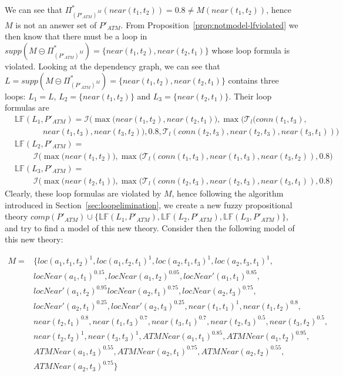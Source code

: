 \documentclass{tlp}
\newcommand{\comp}[1]{\ensuremath{comp(#1)}}
\newcommand{\loopform}[2]{\mathbb{LF}(#1,#2)}
\newcommand{\supp}[1]{\ensuremath{\mathit{supp}(#1)}}
\newcommand{\fsetminus}{\circleddash}
\newcommand{\pretnorm}{\mathcal{T}}
\newcommand{\prefimp}{\mathcal{I}}
\newcommand{\nfimcons}[1]{\Pi_{#1}}
\newcommand{\lfpnfimcons}[1]{\nfimcons{#1}^{*}}
\begin{document}
We can see that $\lfpnfimcons{(P'_{\mathit{ATM}})^M}(near(t_1,t_2)) = 0.8 \neq M(near(t_1,t_2))$, hence $M$ is not an answer set of $P'_{\mathit{ATM}}$.
From Proposition~\ref{prop:notmodel-lfviolated} we then know that there must be a loop in $\supp{M \fsetminus \lfpnfimcons{(P'_{\mathit{ATM}})^M}} = \{near(t_1,t_2), near(t_2,t_1)\}$ whose loop formula is violated. Looking at the dependency graph, we can see that $L = \supp{M \fsetminus \lfpnfimcons{(P'_{\mathit{ATM}})^M}} = \{near(t_1,t_2), near(t_2,t_1)\}$ contains three loops: $L_1 = L$, $L_2 = \{ near(t_1,t_2) \}$ and $L_3 = \{ near(t_2,t_1) \}$. Their loop formulas are
 \begin{align*}
  & \loopform{L_1}{P'_{\mathit{ATM}}} = \prefimp(\max\Big(near(t_1,t_2),near(t_2,t_1)\Big),\max\Big(\pretnorm_l(conn(t_1,t_3),\\
  & \phantom{xxxxxx}near(t_1,t_3),near(t_3,t_2)),0.8,\pretnorm_l(conn(t_2,t_3),near(t_2,t_3),near(t_3,t_1))\Big)\\
  & \loopform{L_2}{P'_{\mathit{ATM}}} = \\
  & \phantom{xxxx}\prefimp(\max\Big(near(t_1,t_2)\Big),\max\Big(\pretnorm_l(conn(t_1,t_3),near(t_1,t_3),near(t_3,t_2)),0.8\Big)\\
  & \loopform{L_3}{P'_{\mathit{ATM}}} = \\
  & \phantom{xxxx}\prefimp(\max\Big(near(t_2,t_1)\Big),\max\Big(\pretnorm_l(conn(t_2,t_3),near(t_2,t_3),near(t_3,t_1)),0.8\Big)
\end{align*}
 Clearly, these loop formulas are violated by $M$, hence following the algorithm introduced in
Section~\ref{sec:loopelimination}, we create a new fuzzy propositional theory $\comp{P'_{\mathit{ATM}}} \cup
\{\loopform{L_1}{P'_{\mathit{ATM}}},\loopform{L_2}{P'_{\mathit{ATM}}},\loopform{L_3}{P'_{\mathit{ATM}}}\}$, and try to
find a model of this new theory. Consider then the following model of this new theory:

\begin{align*}
M = & \{loc(a_1,t_1,t_2)^{1},loc(a_1,t_2,t_1)^1,loc(a_2,t_1,t_3)^{1}, loc(a_2,t_3,t_1)^1,\\
& locNear(a_1,t_1)^{0.15}, locNear(a_1,t_2)^{0.05},locNear'(a_1,t_1)^{0.85},\\
& locNear'(a_1,t_2)^{0.95}locNear(a_2,t_1)^{0.75},locNear(a_2,t_3)^{0.75},\\
& locNear'(a_2,t_1)^{0.25},locNear'(a_2,t_3)^{0.25},near(t_1,t_1)^{1},near(t_1,t_2)^{0.8}, \\
& near(t_2,t_1)^{0.8},near(t_1,t_3)^{0.7},near(t_3,t_1)^{0.7},near(t_2,t_3)^{0.5}, near(t_3,t_2)^{0.5},\\
& near(t_2,t_2)^{1},near(t_3,t_3)^{1},\mathit{ATMNear(a_1,t_1)}^{0.85}, \mathit{ATMNear(a_1,t_2)}^{0.95},\\
& \mathit{ATMNear}(a_1,t_3)^{0.55},\mathit{ATMNear}(a_2,t_1)^{0.75}, \mathit{ATMNear}(a_2,t_2)^{0.55},\\
& \mathit{ATMNear}(a_2,t_3)^{0.75} \}
\end{align*}
\end{document}
